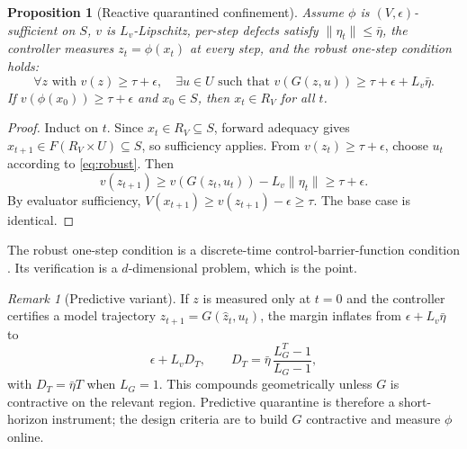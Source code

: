 \documentclass[11pt]{article}
\newtheorem{proposition}{Proposition}[section]
\theoremstyle{definition}
\theoremstyle{remark}
\newtheorem{remark}{Remark}[section]
\newcommand{\RV}{R_V}
\newcommand{\etabar}{\bar{\eta}}
\begin{document}
\begin{proposition}[Reactive quarantined confinement]\label{prop:transfer}
Assume $\phi$ is $(V,\epsilon)$-sufficient on $S$, $v$ is $L_v$-Lipschitz, per-step defects satisfy $\|\eta_t\|\le\etabar$, the controller measures $z_t=\phi(x_t)$ at every step, and the robust one-step condition holds:
\begin{equation}
\forall z\text{ with }v(z)\ge\tau+\epsilon,\quad\exists u\in U\text{ such that }v(G(z,u))\ge\tau+\epsilon+L_v\etabar. \label{eq:robust}
\end{equation}
If $v(\phi(x_0))\ge\tau+\epsilon$ and $x_0\in S$, then $x_t\in\RV$ for all $t$.
\end{proposition}
\begin{proof}
Induct on $t$. Since $x_t\in\RV\subseteq S$, forward adequacy gives $x_{t+1}\in F(\RV\times U)\subseteq S$, so sufficiency applies. From $v(z_t)\ge\tau+\epsilon$, choose $u_t$ according to \eqref{eq:robust}. Then
\begin{equation}
v(z_{t+1})\ge v(G(z_t,u_t))-L_v\|\eta_t\|\ge\tau+\epsilon. \label{eq:ind}
\end{equation}
By evaluator sufficiency, $V(x_{t+1})\ge v(z_{t+1})-\epsilon\ge\tau$. The base case is identical.
\end{proof}

The robust one-step condition is a discrete-time control-barrier-function condition \cite{agrawal2017,khajenejad2021,ames2019}. Its verification is a $d$-dimensional problem, which is the point.

\begin{remark}[Predictive variant]\label{rem:predictive}
If $z$ is measured only at $t=0$ and the controller certifies a model trajectory $\hat z_{t+1}=G(\hat z_t,u_t)$, the margin inflates from $\epsilon+L_v\etabar$ to
\begin{equation}
\epsilon+L_vD_T,\qquad D_T=\etabar\,\frac{L_G^T-1}{L_G-1}, \label{eq:DT}
\end{equation}
with $D_T=\etabar T$ when $L_G=1$. This compounds geometrically unless $G$ is contractive on the relevant region. Predictive quarantine is therefore a short-horizon instrument; the design criteria are to build $G$ contractive and measure $\phi$ online.
\end{remark}
\end{document}

